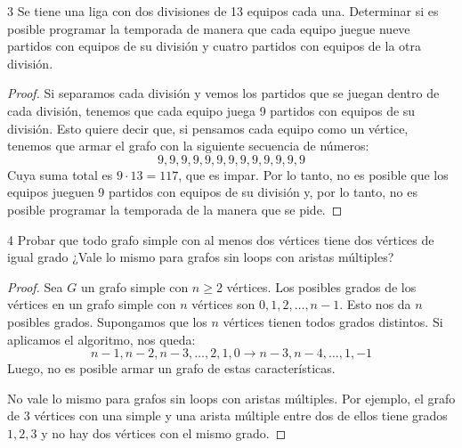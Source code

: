 \vspace{0.5cm}

\begin{ejercicio}{3}
	Se tiene una liga con dos divisiones de 13 equipos cada una. Determinar si es posible programar la temporada de manera que cada equipo juegue nueve partidos con equipos de su división y cuatro partidos con equipos de la otra división.
\end{ejercicio}
\begin{proof}
	Si separamos cada división y vemos los partidos que se juegan dentro de cada división, tenemos que cada equipo juega 9 partidos con equipos de su división. Esto quiere decir que, si pensamos cada equipo como un vértice, tenemos que armar el grafo con la siguiente secuencia de números: \[
		9, 9, 9, 9, 9, 9, 9, 9, 9, 9, 9, 9, 9
	\]
	Cuya suma total es \( 9 \cdot 13 = 117 \), que es impar. Por lo tanto, no es posible que los equipos jueguen 9 partidos con equipos de su división y, por lo tanto, no es posible programar la temporada de la manera que se pide.
\end{proof}

\vspace{0.5cm}

\begin{ejercicioEntregar}{4}
	Probar que todo grafo simple con al menos dos vértices tiene dos vértices de igual grado ¿Vale lo mismo para grafos sin loops con aristas múltiples?
\end{ejercicioEntregar}
\begin{proof}
	Sea \( G \) un grafo simple con \( n \geq 2 \) vértices. Los posibles grados de los vértices en un grafo simple con \( n \) vértices son \( 0, 1, 2, \ldots, n-1 \). Esto nos da \( n \) posibles grados. Supongamos que los \( n \) vértices tienen todos grados distintos. Si aplicamos el algoritmo, nos queda:\[
		n-1, n-2, n-3, \ldots, 2, 1, 0 \to n-3, n-4, \ldots, 1, -1
	\]
	Luego, no es posible armar un grafo de estas características.

	No vale lo mismo para grafos sin loops con aristas múltiples. Por ejemplo, el grafo de 3 vértices con una simple y una arista múltiple entre dos de ellos tiene grados \( 1, 2, 3 \) y no hay dos vértices con el mismo grado.
\end{proof}

\vspace{0.5cm}

